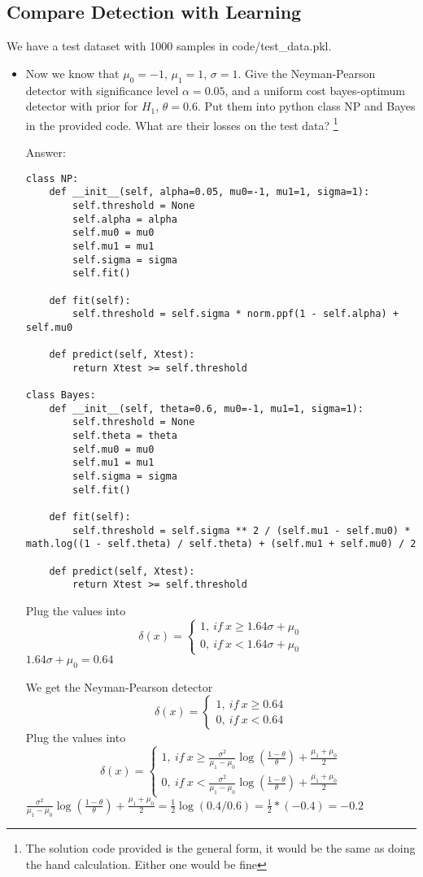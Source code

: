 \documentclass{article}
\newenvironment{answer}{\par\begingroup\color{answer}Answer: }{\endgroup}
\begin{document}
\subsection{Compare Detection with Learning}
We have a test dataset with 1000 samples in code/test\_data.pkl.
\begin{itemize}
\item Now we know that $\mu_0 = -1$, $\mu_1 = 1$, $\sigma = 1$. Give the Neyman-Pearson detector with significance level $\alpha = 0.05$, and a uniform cost bayes-optimum detector with prior for $H_1$, $\theta = 0.6$. Put them into python class NP and Bayes in the provided code. What are their losses on the test data? \footnote{The solution code provided is the general form, it would be the same as doing the hand calculation. Either one would be fine}
\begin{answer}

\begin{verbatim}
class NP:
    def __init__(self, alpha=0.05, mu0=-1, mu1=1, sigma=1):
        self.threshold = None
        self.alpha = alpha
        self.mu0 = mu0
        self.mu1 = mu1
        self.sigma = sigma
        self.fit()

    def fit(self):
        self.threshold = self.sigma * norm.ppf(1 - self.alpha) + self.mu0

    def predict(self, Xtest):
        return Xtest >= self.threshold

class Bayes:
    def __init__(self, theta=0.6, mu0=-1, mu1=1, sigma=1):
        self.threshold = None
        self.theta = theta
        self.mu0 = mu0
        self.mu1 = mu1
        self.sigma = sigma
        self.fit()

    def fit(self):
        self.threshold = self.sigma ** 2 / (self.mu1 - self.mu0) * math.log((1 - self.theta) / self.theta) + (self.mu1 + self.mu0) / 2

    def predict(self, Xtest):
        return Xtest >= self.threshold
\end{verbatim}

Plug the values into 
\[
  \delta(x) = 
\begin{cases}
  1,~if~x \geq 1.64\sigma + \mu_0\\
  0,~if~x < 1.64\sigma + \mu_0
\end{cases}
\]
$1.64\sigma + \mu_0 = 0.64$

We get the Neyman-Pearson detector 
\[
  \delta(x) = 
\begin{cases}
  1,~if~x \geq 0.64\\
  0,~if~x < 0.64
\end{cases}
\]
 Plug the values into 
\[
  \delta(x) = 
\begin{cases}
  1,~if~x \geq \frac{\sigma^2}{\mu_1 - \mu_0} \log(\frac{1 - \theta}{\theta}) + \frac{\mu_1 + \mu_0}{2}\\
  0,~if~x < \frac{\sigma^2}{\mu_1 - \mu_0} \log(\frac{1 - \theta}{\theta}) + \frac{\mu_1 + \mu_0}{2}
\end{cases}
\]
$\frac{\sigma^2}{\mu_1 - \mu_0} \log(\frac{1 - \theta}{\theta}) + \frac{\mu_1 + \mu_0}{2} = \frac12\log(0.4/0.6) = \frac12 *(-0.4) = -0.2$


\end{answer}
\end{itemize}
\end{document}
